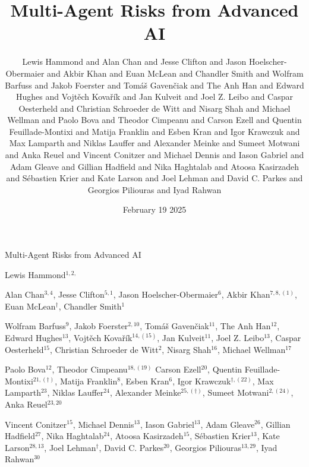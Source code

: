 \documentclass[a4paper]{article}
\title{Multi-Agent Risks from Advanced AI}
\author{
    Lewis Hammond and Alan Chan and Jesse Clifton and Jason Hoelscher-Obermaier and Akbir Khan and Euan McLean and Chandler Smith and Wolfram Barfuss and Jakob Foerster and Tomáš Gavenčiak and The Anh Han and Edward Hughes and Vojtěch Kovařík and Jan Kulveit and Joel Z. Leibo and Caspar Oesterheld and Christian Schroeder de Witt and Nisarg Shah and Michael Wellman and Paolo Bova and Theodor Cimpeanu and Carson Ezell and Quentin Feuillade-Montixi and Matija Franklin and Esben Kran and Igor Krawczuk and Max Lamparth and Niklas Lauffer and Alexander Meinke and Sumeet Motwani and Anka Reuel and Vincent Conitzer and Michael Dennis and Iason Gabriel and Adam Gleave and Gillian Hadfield and Nika Haghtalab and Atoosa Kasirzadeh and Sébastien Krier and Kate Larson and Joel Lehman and David C. Parkes and Georgios Piliouras and Iyad Rahwan
}
\date{February 19 2025}
\begin{document}



\begin{center}
    {\Huge Multi-Agent Risks from Advanced AI}
\end{center}

\vspace{1.5em}



\renewcommand{\thefootnote}{\fnsymbol{footnote}}

\begin{minipage}[t]{0.52\linewidth}
    \raggedright
    \large
    {Lewis Hammond}$^{1,2,}$\footnotemark{}
    \vspace{1em}

    {Alan Chan}$^{3,4}$,
    {Jesse Clifton}$^{5,1}$,
    {Jason Hoelscher-Obermaier}$^{6}$,
    {Akbir Khan}$^{7,8,(1)}$,
    {Euan McLean}$^{\dagger}$,
    {Chandler Smith}$^{1}$
    \vspace{1em}

    {Wolfram Barfuss}$^{9}$,
    {Jakob Foerster}$^{2,10}$,
    {Tomáš Gavenčiak}$^{11}$,
    {The Anh Han}$^{12}$,
    {Edward Hughes}$^{13}$,
    {Vojtěch Kovařík}$^{14,(15)}$,
    {Jan Kulveit}$^{11}$,
    {Joel Z. Leibo}$^{13}$,
    {Caspar Oesterheld}$^{15}$,
    {Christian Schroeder de Witt}$^{2}$,
    {Nisarg Shah}$^{16}$,
    {Michael Wellman}$^{17}$
    \vspace{1em}

    {Paolo Bova}$^{12}$,
    {Theodor Cimpeanu}$^{18,(19)}$
    {Carson Ezell}$^{20}$,
    {Quentin Feuillade- Montixi}$^{21,(\dagger)}$,
    {Matija Franklin}$^{8}$,
    {Esben Kran}$^{6}$,
    {Igor Krawczuk}$^{\dagger,(22)}$,
    {Max Lamparth}$^{23}$,
    {Niklas Lauffer}$^{24}$,
    {Alexander Meinke}$^{25,(\dagger)}$,
    {Sumeet Motwani}$^{2,(24)}$,
    {Anka Reuel}$^{23,20}$
    \vspace{1em}

    {Vincent Conitzer}$^{15}$,
    {Michael Dennis}$^{13}$,
    {Iason Gabriel}$^{13}$,
    {Adam Gleave}$^{26}$,
    {Gillian Hadfield}$^{27}$,
    {Nika Haghtalab}$^{24}$,
    {Atoosa Kasirzadeh}$^{15}$,
    {Sébastien Krier}$^{13}$,
    {Kate Larson}$^{28,13}$,
    {Joel Lehman}$^{\dagger}$,
    {David C. Parkes}$^{20}$,
    {Georgios Piliouras}$^{13,29}$,
    {Iyad Rahwan}$^{30}$
\end{minipage}
\hfill 
\end{document}
